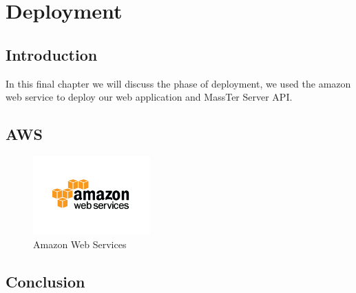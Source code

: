 \chapter{Deployment}

	\section{Introduction}
	In this final chapter we will discuss the phase of deployment, we used the amazon web service to deploy our web application and MassTer Server API.
	\section{AWS}
	\begin{figure}[h]
		\centering
		\includegraphics[width=0.4\textwidth]{aws-logo.png}
		\caption{Amazon Web Services}
	\end{figure}
	\section{Conclusion}